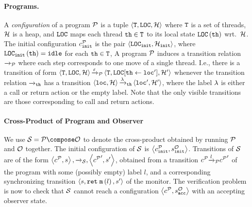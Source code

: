 \paragraph{Programs.}
A {\it configuration} of a program
${\mathcal P}$ is a tuple
$\left\langle{\tt T},{\tt LOC},{\mathcal H}\right\rangle$ where
${\tt T}$ is a set of threads,
${\mathcal H}$ is a heap, and
${\tt LOC}$
maps each thread ${\tt th}\in{\tt T}$ to its
local state ${\tt LOC}\left({\tt th}\right)$ wrt.\ ${\mathcal H}$.
%
%
The initial configuration
$c_{\tt init}^{{\mathcal P}}$ 
is the pair
$\left\langle{\tt LOC}_{\tt init},{\mathcal H}_{\tt init}\right\rangle$,
where
${\tt LOC}_{\tt init}\left({\tt th}\right)={\tt idle}$ for each
${\tt th}\in{\tt T}$,
%
A program ${\mathcal P}$ induces a transition relation
${\xrightarrow{}{}}_{\!\!{\mathcal P}}$ where each step corresponds to one move of a single thread.
I.e., 
there is a transition of form
$\left\langle{\tt T},{\tt LOC},{\mathcal H}\right\rangle
{\xrightarrow{\varepsilon}{}}_{\!\!{\mathcal P}}
\left\langle{\tt T},{\tt LOC}[{\tt th}\leftarrow{\tt loc}'],{\mathcal H}'\right\rangle$
whenever the transition relation ${\xrightarrow{}{}}_{\!\!{\tt th}}$ has a transition
$\left\langle{\tt loc},{\mathcal H}\right\rangle{\xrightarrow{\lambda}{}}_{\!\!{\tt th}}\left\langle{\tt loc}',{\mathcal H}'\right\rangle$,
where the label $\lambda$ is either a call or return action or the empty label.
%
Note that the only visible transitions are those
corresponding to call and return actions.

\paragraph{Cross-Product of Program and Observer}
We use $\system=\prog\compose\observer$ to denote the cross-product obtained by
running ${\mathcal P}$ and ${\mathcal O}$ together.
%
The initial configuration of ${\mathcal S}$ is
$\left\langle c_{\tt init}^{{\mathcal P}},s^{\mathcal O}_{\tt init}\right\rangle$.
Transitions of ${\mathcal S}$ are of the form
$\left\langle c^{{\mathcal P}},s\right\rangle,{\xrightarrow{}{}}_{\!\!{\mathcal S}},\left\langle{c^{{\mathcal P}}}',s'\right\rangle$,
obtained from a transition
$c^{{\mathcal P}} {\xrightarrow{l}{}}_{\!\!{\mathcal P}} {c^{{\mathcal P}}}'$ of the program with some (possibly empty)
label $l$, and
a corresponding synchronizing transition
$\left\langle s,\mathtt{ret}\; {\tt m}\left(l\right),s'\right\rangle$
of the monitor.
The verification problem is now to check that ${\mathcal S}$ cannot reach
a configuration $\left\langle c^{{\mathcal P}},s^{\mathcal O}_{\tt acc}\right\rangle$ with an accepting
observer state.










